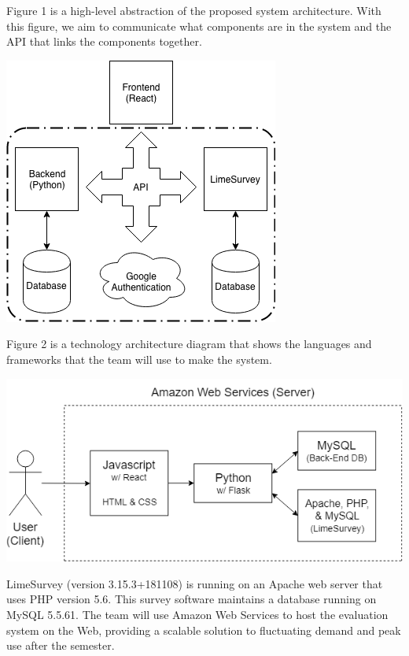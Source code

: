 \documentclass{article}
\begin{document}
Figure 1 is a high-level abstraction of the proposed system architecture. With this figure, we aim to communicate what components are in the system and the API that links the components together.

\begin{center}
\vspace{2mm}
\label{fig:componentdiagram}
{\includegraphics[scale=.6]{images/component_diagram.png}} 
\end{center}

\vspace{3mm}

Figure 2 is a technology architecture diagram that shows the languages and frameworks that the team will use to make the system.

\begin{center}
\label{fig:technologydiagram}
{\includegraphics[scale=.6]{images/technology_architecture_diagram.png}} 
\end{center}

LimeSurvey (version 3.15.3+181108) is running on an Apache web server that uses PHP version 5.6. This survey software maintains a database running on MySQL 5.5.61. The team will use Amazon Web Services to host the evaluation system on the Web, providing a scalable solution to fluctuating demand and peak use after the semester.
\end{document}

